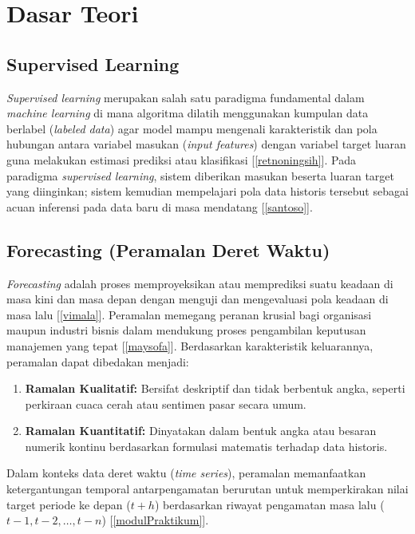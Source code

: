 \chapter{Dasar Teori}

\section{Supervised Learning}
\textit{Supervised learning} merupakan salah satu paradigma fundamental dalam \textit{machine learning} di mana algoritma dilatih menggunakan kumpulan data berlabel (\textit{labeled data}) agar model mampu mengenali karakteristik dan pola hubungan antara variabel masukan (\textit{input features}) dengan variabel target luaran guna melakukan estimasi prediksi atau klasifikasi [\ref{retnoningsih}]. Pada paradigma \textit{supervised learning}, sistem diberikan masukan beserta luaran target yang diinginkan; sistem kemudian mempelajari pola data historis tersebut sebagai acuan inferensi pada data baru di masa mendatang [\ref{santoso}].

\section{Forecasting (Peramalan Deret Waktu)}
\textit{Forecasting} adalah proses memproyeksikan atau memprediksi suatu keadaan di masa kini dan masa depan dengan menguji dan mengevaluasi pola keadaan di masa lalu [\ref{vimala}]. Peramalan memegang peranan krusial bagi organisasi maupun industri bisnis dalam mendukung proses pengambilan keputusan manajemen yang tepat [\ref{maysofa}]. Berdasarkan karakteristik keluarannya, peramalan dapat dibedakan menjadi:
\begin{enumerate}
    \item \textbf{Ramalan Kualitatif:} Bersifat deskriptif dan tidak berbentuk angka, seperti perkiraan cuaca cerah atau sentimen pasar secara umum.
    \item \textbf{Ramalan Kuantitatif:} Dinyatakan dalam bentuk angka atau besaran numerik kontinu berdasarkan formulasi matematis terhadap data historis.
\end{enumerate}
Dalam konteks data deret waktu (\textit{time series}), peramalan memanfaatkan ketergantungan temporal antarpengamatan berurutan untuk memperkirakan nilai target periode ke depan ($t+h$) berdasarkan riwayat pengamatan masa lalu ($t-1, t-2, \dots, t-n$) [\ref{modulPraktikum}].

